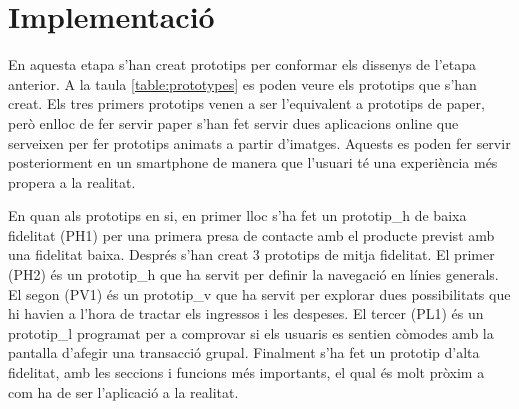 
\section{Implementació}
En aquesta etapa s'han creat prototips per conformar els dissenys de l'etapa anterior. A la taula \ref{table:prototypes} es poden veure els prototips que s'han creat. Els tres primers prototips venen a ser l'equivalent a prototips de paper, però enlloc de fer servir paper s'han fet servir dues aplicacions online que serveixen per fer prototips animats a partir d'imatges. Aquests es poden fer servir posteriorment en un \gls{smartphone} de manera que l'usuari té una experiència més propera a la realitat.

En quan als prototips en si, en primer lloc s'ha fet un \gls{prototip_h} de baixa fidelitat (PH1) per una primera presa de contacte amb el producte previst amb una fidelitat baixa. Després s'han creat 3 prototips de mitja fidelitat. El primer (PH2) és un \gls{prototip_h} que ha servit per definir la navegació en línies generals. El segon (PV1) és un \gls{prototip_v} que ha servit per explorar dues possibilitats que hi havien a l'hora de tractar els ingressos i les despeses. El tercer (PL1) és un \gls{prototip_l} programat per a comprovar si els usuaris es sentien còmodes amb la pantalla d'afegir una transacció grupal. Finalment s'ha fet un prototip d'alta fidelitat, amb les seccions i funcions més importants, el qual és molt pròxim a com ha de ser l'aplicació a la realitat. 

